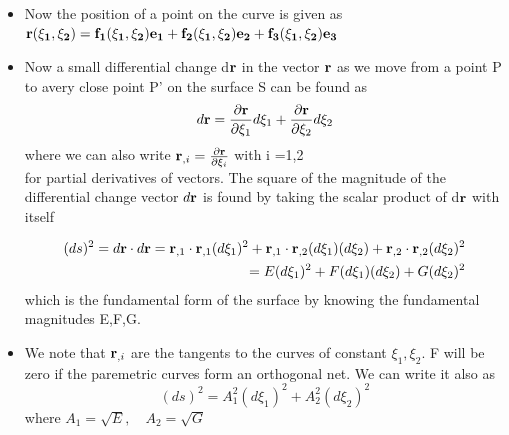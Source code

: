 	\begin{frame}
		\begin{itemize}
			\item Now the position of a point on the curve is given as $\mathbf{r(\xi_1,\xi_2) = f_1(\xi_1,\xi_2)\mathbf{e_1} +f_2(\xi_1,\xi_2)\mathbf{e_2} + f_3(\xi_1,\xi_2)}\mathbf{e_3}$
			\item Now a small differential change d$\mathbf{r}$ in the vector $\mathbf{r}$ as we move from a point P to avery close point P' on the surface S can be found as
			\begin{equation}
			d\mathbf{r} = \frac{\partial \mathbf{r}}{\partial \xi_1}d\xi_1 + \frac{\partial \mathbf{r}}{\partial \xi_2}d\xi_2
			\end{equation}
			where we can also write $\mathbf{r}_{,i} = \frac{\partial \mathbf{r}}{\partial \xi_i}$ with i =1,2 \\
			for partial derivatives of vectors. The square of the magnitude of the differential change vector $d\mathbf{r}$ is found by taking the scalar product of d$\mathbf{r}$ with itself

			\begin{equation}
			\begin{aligned}
				(ds)^2 = d\mathbf{r} \cdot d\mathbf{r} =\mathbf{r}_{,1}\cdot \mathbf{r}_{,1} (d\xi_1)^2 +\mathbf{r}_{,1}\cdot \mathbf{r}_{,2} (d\xi_1)(d\xi_2)+\mathbf{r}_{,2}\cdot \mathbf{r}_{,2} (d\xi_2)^2\\
				 = E (d\xi_1)^2 + F(d\xi_1)(d\xi_2)+G(d\xi_2)^2
			\end{aligned}	
			\end{equation}
			which is the fundamental form of the surface by knowing the fundamental magnitudes E,F,G. 
			\item We note that $\mathbf{r}_{,i}$ are the tangents to the curves of constant $\xi_1,\xi_2$. F will be zero if the paremetric curves form an orthogonal net. We can write it also as
			\begin{equation}
			(ds)^2 = A_1^2 (d\xi_1)^2  + A_2^2  (d\xi_2)^2 
			\end{equation}
			where $A_1 = \sqrt{E},\quad A_2 = \sqrt{G}$
		\end{itemize}
	\end{frame}


